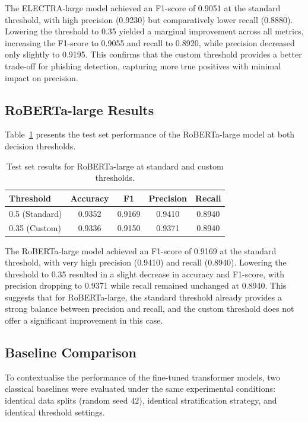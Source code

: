 The \acs{ELECTRA}-large model achieved an F1-score of 0.9051 at the standard threshold, with high precision (0.9230) but comparatively lower recall (0.8880). Lowering the threshold to 0.35 yielded a marginal improvement across all metrics, increasing the F1-score to 0.9055 and recall to 0.8920, while precision decreased only slightly to 0.9195. This confirms that the custom threshold provides a better trade-off for phishing detection, capturing more true positives with minimal impact on precision.

\subsection{RoBERTa-large Results}
Table~\ref{tab:roberta_results} presents the test set performance of the \acs{RoBERTa}-large model at both decision thresholds.

\begin{table}[htbp]
\centering
\caption{Test set results for \acs{RoBERTa}-large at standard and custom thresholds.}
\label{tab:roberta_results}
\begin{tabular}{lcccc}
\hline
\textbf{Threshold} & \textbf{Accuracy} & \textbf{F1} & \textbf{Precision} & \textbf{Recall} \\
\hline
0.5 (Standard) & 0.9352 & 0.9169 & 0.9410 & 0.8940 \\
0.35 (Custom)  & 0.9336 & 0.9150 & 0.9371 & 0.8940 \\
\hline
\end{tabular}
\end{table}

The \acs{RoBERTa}-large model achieved an F1-score of 0.9169 at the standard threshold, with very high precision (0.9410) and recall (0.8940). Lowering the threshold to 0.35 resulted in a slight decrease in accuracy and F1-score, with precision dropping to 0.9371 while recall remained unchanged at 0.8940. This suggests that for \acs{RoBERTa}-large, the standard threshold already provides a strong balance between precision and recall, and the custom threshold does not offer a significant improvement in this case.

\subsection{Baseline Comparison}
\label{sec:baseline_comparison}

To contextualise the performance of the fine-tuned transformer models, two classical baselines were evaluated under the same experimental conditions: identical data splits (random seed 42), identical stratification strategy, and identical threshold settings.

